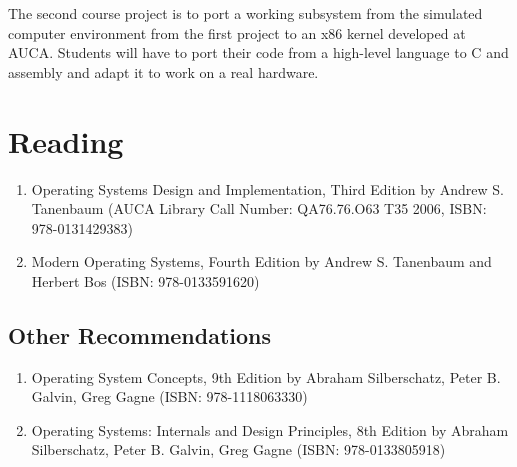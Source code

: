 \documentclass[12pt,a4paper,oneside]{article}
\begin{document}
        The second course project is to port a working subsystem from the
        simulated computer environment from the first project to an x86 kernel
        developed at AUCA. Students will have to port their code from a
        high-level language to C and assembly and adapt it to work on a real
        hardware.

    \section{Reading}
		\begin{enumerate}
            \item Operating Systems Design and Implementation, Third Edition by Andrew S.
            Tanenbaum (AUCA Library Call Number: QA76.76.O63 T35 2006, ISBN:
            978-0131429383)
            \item Modern Operating Systems, Fourth Edition by Andrew S. Tanenbaum and
            Herbert Bos (ISBN: 978-0133591620)
        \end{enumerate}

        \subsection{Other Recommendations}
            \begin{enumerate}
                \item Operating System Concepts, 9th Edition by Abraham
                Silberschatz, Peter B. Galvin, Greg Gagne (ISBN: 978-1118063330)
                \item Operating Systems: Internals and Design Principles, 8th
                Edition by Abraham Silberschatz, Peter B. Galvin, Greg Gagne
                (ISBN: 978-0133805918)
            \end{enumerate}
\end{document}
